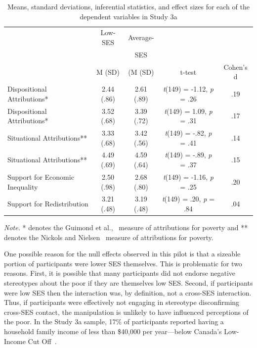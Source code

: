 \documentclass{sfuthesis}
\begin{document}
\begin{table}[h]
  \begin{center}
    \caption{Means, standard deviations, inferential statistics, and effect sizes for each of the dependent variables in Study 3a}
    \label{tab:sixthtable}
    \begin{tabular}{l c c c c}
    \hline
      & \multicolumn{1}{c}{Low-SES} & \multicolumn{1}{c}{Average-} & & \\
      & & \multicolumn{1}{c}{SES} & & \\\cmidrule{2-3}
      & \multicolumn{1}{c}{M (SD)} & \multicolumn{1}{c}{(M (SD)} & t-test & Cohen's d\\
      \hline
      Dispositional Attributions* & \multicolumn{1}{c}{2.44 (.86)} & \multicolumn{1}{c}{2.61 (.89)} & \multicolumn{1}{c}{\textit{t}(149) = -1.12, \textit{p} = .26} & .19\\
      Dispositional Attributions* & \multicolumn{1}{c}{3.52 (.68)} & \multicolumn{1}{c}{3.39 (.72)} & \multicolumn{1}{c}{\textit{t}(149) = 1.09, \textit{p} = .31} & .17\\
      Situational Attributions** & \multicolumn{1}{c}{3.33 (.68)} & \multicolumn{1}{c}{3.42 (.56)} & \multicolumn{1}{c}{\textit{t}(149) = -.82, \textit{p} = .41} & .14\\
      Situational Attributions** & \multicolumn{1}{c}{4.49 (.69)} & \multicolumn{1}{c}{4.59 (.64)} & \multicolumn{1}{c}{\textit{t}(149) = -.89, \textit{p} = .37} & .15\\
      Support for Economic Inequality & \multicolumn{1}{c}{2.50 (.98)} & \multicolumn{1}{c}{2.68 (.80)} & \multicolumn{1}{c}{\textit{t}(149) = -1.16, \textit{p} = .25} & .20\\
      Support for Redistribution & \multicolumn{1}{c}{3.21 (.48)} & \multicolumn{1}{c}{3.19 (.48)} & \multicolumn{1}{c}{\textit{t}(149) = .20, \textit{p} = .84} & .04\\
      \hline
    \end{tabular}
  \end{center}
  \textit{Note.} * denotes the Guimond et al.,~\cite{guimond89} measure of attributions for poverty and ** denotes the Nickols and Nielsen~\cite{nickols11} measure of attributions for poverty.
\end{table}

One possible reason for the null effects observed in this pilot is that a sizeable portion of participants were lower SES themselves. This is problematic for two reasons. First, it is possible that many participants did not endorse negative stereotypes about the poor if they are themselves low SES. Second, if participants were low SES then the interaction was, by definition, not a cross-SES interaction. Thus, if participants were effectively not engaging in stereotype disconfirming cross-SES contact, the manipulation is unlikely to have influenced perceptions of the poor. In the Study 3a sample, 17\% of participants reported having a household family income of less than \$40,000 per year—below Canada’s Low-Income Cut Off~\cite{statcan18}.
\end{document}
